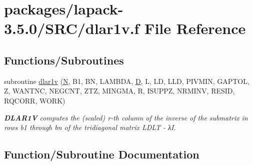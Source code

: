 \hypertarget{dlar1v_8f}{}\section{packages/lapack-\/3.5.0/\+S\+R\+C/dlar1v.f File Reference}
\label{dlar1v_8f}
\subsection*{Functions/\+Subroutines}
\begin{DoxyCompactItemize}
\item 
subroutine \hyperlink{dlar1v_8f_a4944aae03c7a236a2d36bee520665e5d}{dlar1v} (\hyperlink{polmisc_8c_a0240ac851181b84ac374872dc5434ee4}{N}, B1, B\+N, L\+A\+M\+B\+D\+A, \hyperlink{odrpack_8h_a7dae6ea403d00f3687f24a874e67d139}{D}, L, L\+D, L\+L\+D, P\+I\+V\+M\+I\+N, G\+A\+P\+T\+O\+L, Z, W\+A\+N\+T\+N\+C, N\+E\+G\+C\+N\+T, Z\+T\+Z, M\+I\+N\+G\+M\+A, R, I\+S\+U\+P\+P\+Z, N\+R\+M\+I\+N\+V, R\+E\+S\+I\+D, R\+Q\+C\+O\+R\+R, W\+O\+R\+K)
\begin{DoxyCompactList}\small\item\em {\bfseries D\+L\+A\+R1\+V} computes the (scaled) r-\/th column of the inverse of the submatrix in rows b1 through bn of the tridiagonal matrix L\+D\+L\+T -\/ λ\+I. \end{DoxyCompactList}\end{DoxyCompactItemize}


\subsection{Function/\+Subroutine Documentation}
\hypertarget{dlar1v_8f_a4944aae03c7a236a2d36bee520665e5d}{}
